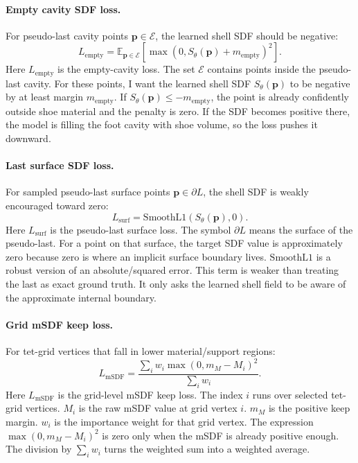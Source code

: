 \documentclass[11pt]{article}
\newcommand{\pt}{\mathbf{p}}
\begin{document}
\paragraph{Empty cavity SDF loss.}
For pseudo-last cavity points \(\pt\in\mathcal{E}\), the learned shell SDF should
be negative:
\[
L_{\text{empty}}
=
\mathbb{E}_{\pt\in\mathcal{E}}
\left[
\max(0,S_\theta(\pt)+m_{\text{empty}})^2
\right].
\]
Here \(L_{\text{empty}}\) is the empty-cavity loss.  The set \(\mathcal{E}\)
contains points inside the pseudo-last cavity.  For these points, I want the
learned shell SDF \(S_\theta(\pt)\) to be negative by at least margin
\(m_{\text{empty}}\).  If \(S_\theta(\pt)\le -m_{\text{empty}}\), the point is
already confidently outside shoe material and the penalty is zero.  If the SDF
becomes positive there, the model is filling the foot cavity with shoe volume,
so the loss pushes it downward.

\paragraph{Last surface SDF loss.}
For sampled pseudo-last surface points \(\pt\in\partial L\), the shell SDF is
weakly encouraged toward zero:
\[
L_{\text{surf}}
=
\text{SmoothL1}(S_\theta(\pt),0).
\]
Here \(L_{\text{surf}}\) is the pseudo-last surface loss.  The symbol
\(\partial L\) means the surface of the pseudo-last.  For a point on that
surface, the target SDF value is approximately zero because zero is where an
implicit surface boundary lives.  \(\text{SmoothL1}\) is a robust version of an
absolute/squared error.  This term is weaker than treating the last as exact
ground truth.  It only asks the learned shell field to be aware of the
approximate internal boundary.

\paragraph{Grid mSDF keep loss.}
For tet-grid vertices that fall in lower material/support regions:
\[
L_{\text{mSDF}}
=
\frac{
\sum_i w_i\max(0,m_M-M_i)^2
}{
\sum_i w_i
}.
\]
Here \(L_{\text{mSDF}}\) is the grid-level mSDF keep loss.  The index \(i\)
runs over selected tet-grid vertices.  \(M_i\) is the raw mSDF value at grid
vertex \(i\).  \(m_M\) is the positive keep margin.  \(w_i\) is the importance
weight for that grid vertex.  The expression \(\max(0,m_M-M_i)^2\) is zero only
when the mSDF is already positive enough.  The division by \(\sum_i w_i\)
turns the weighted sum into a weighted average.
\end{document}
